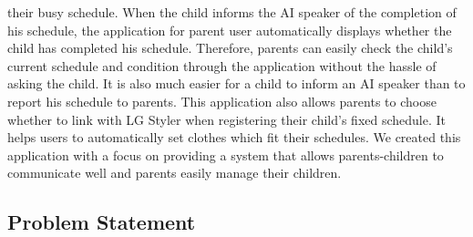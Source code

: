\documentclass[conference]{IEEEtran}
\begin{document}
their busy schedule. When the child informs the AI speaker of the completion of his schedule, the application for parent user automatically displays whether the child has completed his schedule. Therefore, parents can easily check the child's current schedule and condition through the application without the hassle of asking the child.  It is also much easier for a child to inform an AI speaker than to report his schedule to parents. This application also allows parents to choose whether to link with LG Styler when registering their child's fixed schedule. It helps users to automatically set clothes which fit their schedules. We created this application with a focus on providing a system that allows parents-children to communicate well and parents easily manage their children.

\subsection{\large{Problem Statement}}
\end{document}
